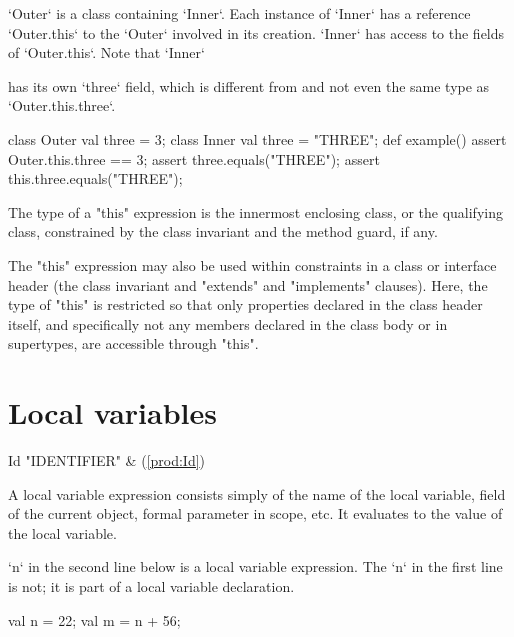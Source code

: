 \begin{ex}
\xcd`Outer` is a class containing \xcd`Inner`.  Each instance of
\xcd`Inner` has a reference \xcd`Outer.this` to the \xcd`Outer` involved in its
creation.  \xcd`Inner` has access to the fields of \xcd`Outer.this`.  Note
that \xcd`Inner`

has its own \xcd`three` field, which is different from and not even the same
type as \xcd`Outer.this.three`. 
\begin{xten}
class Outer {
  val three = 3;
  class Inner {
     val three = "THREE";
     def example()  {
       assert Outer.this.three == 3;
       assert three.equals("THREE");
       assert this.three.equals("THREE");
     }
  }
}
\end{xten}
\end{ex}

The type of a \xcd"this" expression is the
innermost enclosing class, or the qualifying class,
constrained by the class invariant and the
method guard, if any.

The \xcd"this" expression may also be used within constraints in
a class or interface header (the class invariant and
\xcd"extends" and \xcd"implements" clauses).  Here, the type of
\xcd"this" is restricted so that only properties declared in the
class header itself, and specifically not any members declared in the class
body or in supertypes, are accessible through \xcd"this".

\section{Local variables}

\begin{bbgrammar}
                  Id \: \xcd"IDENTIFIER"  & (\ref{prod:Id}) \\
\end{bbgrammar}

A local variable expression consists simply of the name of the local variable,
field of the current object, formal parameter in scope, etc. It evaluates to
the value of the local variable. 


\begin{ex}
\xcd`n` in the second line below is a local
variable expression.  The \xcd`n` in the first line is not; it is part of a
local variable declaration.
\begin{xten}
val n = 22;
val m = n + 56;
\end{xten}

\end{ex}

